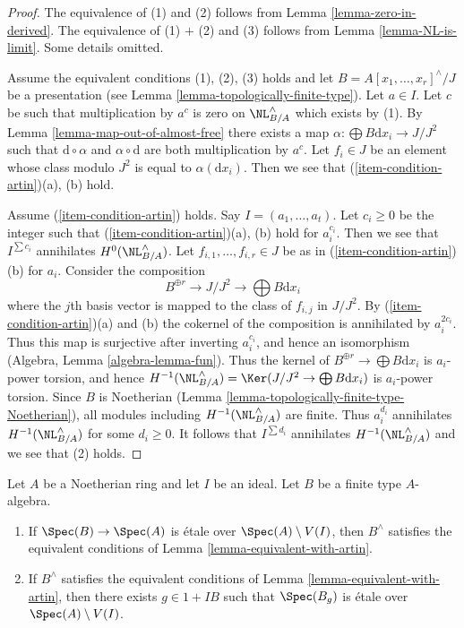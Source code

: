 \begin{proof}
The equivalence of (1) and (2) follows from
Lemma \ref{lemma-zero-in-derived}.
The equivalence of (1) $+$ (2) and (3) follows from
Lemma \ref{lemma-NL-is-limit}. Some details omitted.

\medskip\noindent
Assume the equivalent conditions (1), (2), (3) holds and let
$B = A[x_1, \ldots, x_r]^\wedge/J$ be a presentation
(see Lemma \ref{lemma-topologically-finite-type}). Let $a \in I$.
Let $c$ be such that multiplication by $a^c$ is zero on $\NL^\wedge_{B/A}$
which exists by (1). By Lemma \ref{lemma-map-out-of-almost-free}
there exists a map $\alpha : \bigoplus B\text{d}x_i \to J/J^2$ such that
$\text{d} \circ \alpha$ and $\alpha \circ \text{d}$ are both
multiplication by $a^c$. Let $f_i \in J$ be an element whose
class modulo $J^2$ is equal to $\alpha(\text{d}x_i)$.
Then we see that (\ref{item-condition-artin})(a), (b) hold.

\medskip\noindent
Assume (\ref{item-condition-artin}) holds. Say $I = (a_1, \ldots, a_t)$.
Let $c_i \geq 0$ be the integer such that (\ref{item-condition-artin})(a), (b)
hold for $a_i^{c_i}$. Then we see that $I^{\sum c_i}$ annihilates
$H^0(\NL^\wedge_{B/A})$. Let $f_{i, 1}, \ldots, f_{i, r} \in J$
be as in (\ref{item-condition-artin})(b) for $a_i$.
Consider the composition
$$
B^{\oplus r} \to J/J^2 \to \bigoplus B\text{d}x_i
$$
where the $j$th basis vector is mapped to the class of $f_{i, j}$ in $J/J^2$.
By (\ref{item-condition-artin})(a) and (b) the cokernel of the composition
is annihilated by $a_i^{2c_i}$. Thus this map is surjective after inverting
$a_i^{c_i}$, and hence an isomorphism (Algebra, Lemma \ref{algebra-lemma-fun}).
Thus the kernel of $B^{\oplus r} \to \bigoplus B\text{d}x_i$ is
$a_i$-power torsion, and hence
$H^{-1}(\NL^\wedge_{B/A}) = \Ker(J/J^2 \to \bigoplus B\text{d}x_i)$
is $a_i$-power torsion. Since $B$ is Noetherian
(Lemma \ref{lemma-topologically-finite-type-Noetherian}),
all modules including $H^{-1}(\NL^\wedge_{B/A})$ are finite.
Thus $a_i^{d_i}$ annihilates $H^{-1}(\NL^\wedge_{B/A})$ for some $d_i \geq 0$.
It follows that $I^{\sum d_i}$ annihilates $H^{-1}(\NL^\wedge_{B/A})$
and we see that (2) holds.
\end{proof}

\begin{lemma}
\label{lemma-rig-etale}
Let $A$ be a Noetherian ring and let $I$ be an ideal.
Let $B$ be a finite type $A$-algebra.
\begin{enumerate}
\item If $\Spec(B) \to \Spec(A)$ is \'etale over $\Spec(A) \setminus V(I)$,
then $B^\wedge$ satisfies the equivalent conditions of
Lemma \ref{lemma-equivalent-with-artin}.
\item If $B^\wedge$ satisfies the equivalent conditions of
Lemma \ref{lemma-equivalent-with-artin},
then there exists $g \in 1 + IB$ such that $\Spec(B_g)$ is \'etale
over $\Spec(A) \setminus V(I)$.
\end{enumerate}
\end{lemma}

